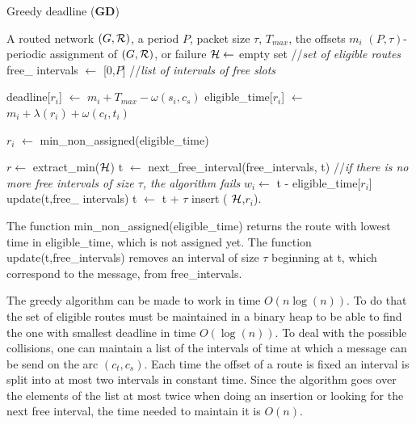 \documentclass[10pt, conference, letterpaper]{IEEEtran}
\begin{document}
     \begin{algorithm}[H]
    \caption{ Greedy deadline ({\bf GD}) }
    \begin{algorithmic}
    \REQUIRE A routed network $(G,{\cal R})$, a period $P$, packet size $\tau$, $ T_{max}$, the offsets $m_i$
    \ENSURE $(P,\tau)$-periodic assignment of $(G,{\cal R})$, or failure
   \STATE  ${\cal H} \leftarrow$ empty set //{\em set of eligible routes}
       \STATE  free\_ intervals $\leftarrow$ [0,$P$] //{\em list of intervals of free slots}
  
    \STATE  deadline[$r_i$]  $\leftarrow$  $m_{i} + T_{max} - \omega(s_i,c_s)$
    \STATE  eligible\_time[$r_i$] $\leftarrow$ $m_{i} +  \lambda(r_i) + \omega(c_t,t_i)$
      \ENDFOR
      
      \STATE $r_i$ $\leftarrow $ min\_non\_assigned(eligible\_time)
      \ENDIF
     
      \STATE $r \leftarrow $ extract\_min(${\cal H}$)
      \STATE t $\leftarrow$ next\_free\_interval(free\_intervals, t) //{\em if there is no more free intervals of size $\tau$, the algorithm fails}
      \STATE $w_i \leftarrow$ t - eligible\_time[$r_i$]
      \STATE update(t,free\_ intervals)
      \STATE t $\leftarrow$ t + $\tau$
      \STATE insert ( ${\cal H}$,$r_i$).
      \ENDFOR
      \ENDWHILE
    

    \end{algorithmic}
    \end{algorithm}
    The function  min\_non\_assigned(eligible\_time) returns the route with lowest time in eligible\_time, which is not assigned yet. The function update(t,free\_intervals) removes an interval of size $\tau$ beginning at t, which correspond to the message,  from free\_intervals.


    The greedy algorithm can be made to work in time $O(n\log(n))$. 
    To do that the set of eligible routes must be maintained in a binary heap
    to be able to find the one with smallest deadline in time $O(\log(n))$. 
    To deal with the possible collisions, one can maintain a list of the intervals
    of time at which a message can be send on the arc $(c_t,c_s)$. Each time the offset of a 
    route is fixed an interval is split into at most two intervals in constant time. 
    Since the algorithm goes over the elements of the list at most twice when doing an insertion
    or looking for the next free interval, the time needed to maintain it is $O(n)$. 
    
\end{document}
